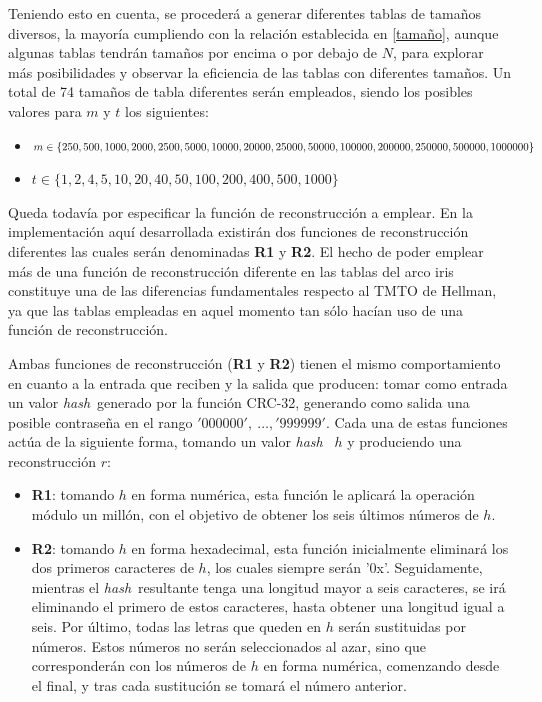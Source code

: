 \documentclass[12pt,spanish,listoffigures,listoftables]{tfgetsinf}
\newcommand{\hash}{\textit{hash}}
\begin{document}
Teniendo esto en cuenta, se procederá a generar diferentes tablas de tamaños diversos, la mayoría cumpliendo con la relación establecida en \eqref{tamaño}, aunque algunas tablas tendrán tamaños por encima o por debajo de $N$, para explorar más posibilidades y observar la eficiencia de las tablas con diferentes tamaños. Un total de 74 tamaños de tabla diferentes serán empleados, siendo los posibles valores para $m$ y $t$ los siguientes:

\begin{itemize}

    \item $m \in \{250, 500, 1000, 2000, 2500, 5000, 10000, 20000, \\
    25000, 50000, 100000, 200000, 250000, 500000, 1000000\}$
    
    \item $t \in \{1, 2, 4, 5, 10, 20, 40, 50, 100, 200, 400, 500, 1000\}$
    
\end{itemize}

Queda todavía por especificar la función de reconstrucción a emplear. En la implementación aquí desarrollada existirán dos funciones de reconstrucción diferentes las cuales serán denominadas \textbf{R1} y \textbf{R2}. El hecho de poder emplear más de una función de reconstrucción diferente en las tablas del arco iris constituye una de las diferencias fundamentales respecto al TMTO de Hellman, ya que las tablas empleadas en aquel momento tan sólo hacían uso de una función de reconstrucción.

Ambas funciones de reconstrucción (\textbf{R1} y \textbf{R2}) tienen el mismo comportamiento en cuanto a la entrada que reciben y la salida que producen: tomar como entrada un valor \hash~generado por la función CRC-32, generando como salida una posible contraseña en el rango $'000000',~\dots, '999999'$. Cada una de estas funciones actúa de la siguiente forma, tomando un valor \hash~ $h$ y produciendo una reconstrucción $r$:

\begin{itemize}

    \item \textbf{R1}: tomando $h$ en forma numérica, esta función le aplicará la operación módulo un millón, con el objetivo de obtener los seis últimos números de $h$.
    
    \item \textbf{R2}: tomando $h$ en forma hexadecimal, esta función inicialmente eliminará los dos primeros caracteres de $h$, los cuales siempre serán '0x'. Seguidamente, mientras el \hash~resultante tenga una longitud mayor a seis caracteres, se irá eliminando el primero de estos caracteres, hasta obtener una longitud igual a seis. Por último, todas las letras que queden en $h$ serán sustituidas por números. Estos números no serán seleccionados al azar, sino que corresponderán con los números de $h$ en forma numérica, comenzando desde el final, y tras cada sustitución se tomará el número anterior.
    
\end{itemize}
\end{document}
